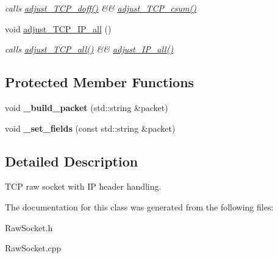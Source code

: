 \begin{CompactItemize}
\begin{CompactList}\small\item\em calls \hyperlink{classsocketpp_1_1TCP__RawSocket_029eb8bfbf19531253edf046775d9f5f}{adjust\_\-TCP\_\-doff()} \&\& \hyperlink{classsocketpp_1_1TCP__IP__RawSocket_c203b188308532333bdf53a4e18bc230}{adjust\_\-TCP\_\-csum()} \item\end{CompactList}\item 
\hypertarget{classsocketpp_1_1TCP__IP__RawSocket_dd3b21314f1768962bf399291f406768}{
void \hyperlink{classsocketpp_1_1TCP__IP__RawSocket_dd3b21314f1768962bf399291f406768}{adjust\_\-TCP\_\-IP\_\-all} ()}
\label{classsocketpp_1_1TCP__IP__RawSocket_dd3b21314f1768962bf399291f406768}

\begin{CompactList}\small\item\em calls \hyperlink{classsocketpp_1_1TCP__IP__RawSocket_3644327ff72d322ff809ac432f59783b}{adjust\_\-TCP\_\-all()} \&\& \hyperlink{classsocketpp_1_1IP__RawSocket_45e60510233daaa2f279d3a4706fdce5}{adjust\_\-IP\_\-all()} \item\end{CompactList}\end{CompactItemize}
\subsection*{Protected Member Functions}
\begin{CompactItemize}
\item 
\hypertarget{classsocketpp_1_1TCP__IP__RawSocket_281508237add8a3c530bb0be0b6a1e7b}{
void \textbf{\_\-build\_\-packet} (std::string \&packet)}
\label{classsocketpp_1_1TCP__IP__RawSocket_281508237add8a3c530bb0be0b6a1e7b}

\item 
\hypertarget{classsocketpp_1_1TCP__IP__RawSocket_f8f606ce33835813cc5c3a530e181432}{
void \textbf{\_\-set\_\-fields} (const std::string \&packet)}
\label{classsocketpp_1_1TCP__IP__RawSocket_f8f606ce33835813cc5c3a530e181432}

\end{CompactItemize}


\subsection{Detailed Description}
TCP raw socket with IP header handling. 

The documentation for this class was generated from the following files:\begin{CompactItemize}
\item 
RawSocket.h\item 
RawSocket.cpp\end{CompactItemize}
